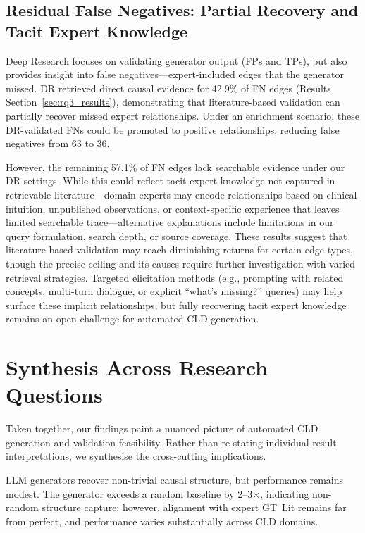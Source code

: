 \subsection{Residual False Negatives: Partial Recovery and Tacit Expert Knowledge}

Deep Research focuses on validating generator output (FPs and TPs), but also provides insight into false negatives---expert-included edges that the generator missed. DR retrieved direct causal evidence for 42.9\% of FN edges (Results Section~\ref{sec:rq3_results}), demonstrating that literature-based validation can partially recover missed expert relationships. Under an enrichment scenario, these DR-validated FNs could be promoted to positive relationships, reducing false negatives from 63 to 36.

However, the remaining 57.1\% of FN edges lack searchable evidence under our DR settings. While this could reflect tacit expert knowledge not captured in retrievable literature---domain experts may encode relationships based on clinical intuition, unpublished observations, or context-specific experience that leaves limited searchable trace---alternative explanations include limitations in our query formulation, search depth, or source coverage. These results suggest that literature-based validation may reach diminishing returns for certain edge types, though the precise ceiling and its causes require further investigation with varied retrieval strategies. Targeted elicitation methods (e.g., prompting with related concepts, multi-turn dialogue, or explicit ``what's missing?'' queries) may help surface these implicit relationships, but fully recovering tacit expert knowledge remains an open challenge for automated CLD generation.

\section{Synthesis Across Research Questions}
\label{sec:discussion_synthesis}

Taken together, our findings paint a nuanced picture of automated CLD generation and validation feasibility. Rather than re-stating individual result interpretations, we synthesise the cross-cutting implications.

LLM generators recover non-trivial causal structure, but performance remains modest. The generator exceeds a random baseline by 2--3$\times$, indicating non-random structure capture; however, alignment with expert GT~Lit remains far from perfect, and performance varies substantially across CLD domains.


